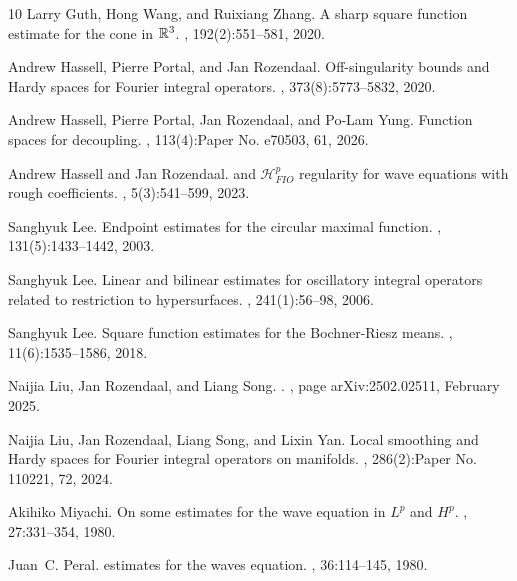 \documentclass{amsart}
\numberwithin{equation}{section}
\theoremstyle{definition}
\begin{document}
\begin{thebibliography}{10}
Larry Guth, Hong Wang, and Ruixiang Zhang.
\newblock A sharp square function estimate for the cone in {$\Bbb {R}^3$}.
, 192(2):551--581, 2020.

Andrew Hassell, Pierre Portal, and Jan Rozendaal.
\newblock Off-singularity bounds and {Hardy} spaces for {Fourier} integral
  operators.
, 373(8):5773--5832, 2020.

Andrew Hassell, Pierre Portal, Jan Rozendaal, and Po-Lam Yung.
\newblock Function spaces for decoupling.
, 113(4):Paper No. e70503, 61, 2026.

Andrew Hassell and Jan Rozendaal.
 and {{\(\mathcal{H}_{FIO}^p\)}} regularity for wave
  equations with rough coefficients.
, 5(3):541--599, 2023.

Sanghyuk Lee.
\newblock Endpoint estimates for the circular maximal function.
, 131(5):1433--1442, 2003.

Sanghyuk Lee.
\newblock Linear and bilinear estimates for oscillatory integral operators
  related to restriction to hypersurfaces.
, 241(1):56--98, 2006.

Sanghyuk Lee.
\newblock Square function estimates for the {B}ochner-{R}iesz means.
, 11(6):1535--1586, 2018.

Naijia {Liu}, Jan {Rozendaal}, and Liang {Song}.
.
, page arXiv:2502.02511, February 2025.

Naijia Liu, Jan Rozendaal, Liang Song, and Lixin Yan.
\newblock Local smoothing and {H}ardy spaces for {F}ourier integral operators
  on manifolds.
, 286(2):Paper No. 110221, 72, 2024.

Akihiko Miyachi.
\newblock On some estimates for the wave equation in {{\(L^p\)}} and
  {{\(H^p\)}}.
, 27:331--354, 1980.

Juan~C. Peral.
 estimates for the waves equation.
, 36:114--145, 1980.


\end{thebibliography}
\end{document}
